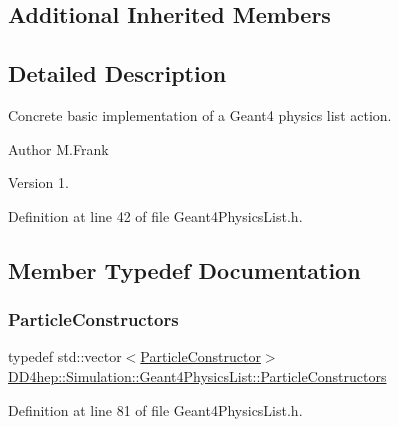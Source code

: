 \subsection*{Additional Inherited Members}


\subsection{Detailed Description}
Concrete basic implementation of a Geant4 physics list action. 

\begin{DoxyAuthor}{Author}
M.\+Frank 
\end{DoxyAuthor}
\begin{DoxyVersion}{Version}
1. 
\end{DoxyVersion}


Definition at line 42 of file Geant4\+Physics\+List.\+h.



\subsection{Member Typedef Documentation}
\hypertarget{class_d_d4hep_1_1_simulation_1_1_geant4_physics_list_afaee3763aea79b299830be37f9642342}{}\label{class_d_d4hep_1_1_simulation_1_1_geant4_physics_list_afaee3763aea79b299830be37f9642342} 
\subsubsection{\texorpdfstring{Particle\+Constructors}{ParticleConstructors}}
{\footnotesize\ttfamily typedef std\+::vector$<$\hyperlink{class_d_d4hep_1_1_simulation_1_1_geant4_physics_list_1_1_particle_constructor}{Particle\+Constructor}$>$ \hyperlink{class_d_d4hep_1_1_simulation_1_1_geant4_physics_list_afaee3763aea79b299830be37f9642342}{D\+D4hep\+::\+Simulation\+::\+Geant4\+Physics\+List\+::\+Particle\+Constructors}}



Definition at line 81 of file Geant4\+Physics\+List.\+h.

\hypertarget{class_d_d4hep_1_1_simulation_1_1_geant4_physics_list_adf5c4ae6ed4befac883cf5f253f4220e}{}\label{class_d_d4hep_1_1_simulation_1_1_geant4_physics_list_adf5c4ae6ed4befac883cf5f253f4220e} 
